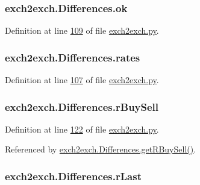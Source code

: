 \subsubsection[{\texorpdfstring{ok}{ok}}]{\setlength{\rightskip}{0pt plus 5cm}exch2exch.\+Differences.\+ok}\hypertarget{classexch2exch_1_1_differences_a6de3ee563584c83a97ba815db8ec7831}{}\label{classexch2exch_1_1_differences_a6de3ee563584c83a97ba815db8ec7831}


Definition at line \hyperlink{exch2exch_8py_source_l00109}{109} of file \hyperlink{exch2exch_8py_source}{exch2exch.\+py}.

\subsubsection[{\texorpdfstring{rates}{rates}}]{\setlength{\rightskip}{0pt plus 5cm}exch2exch.\+Differences.\+rates}\hypertarget{classexch2exch_1_1_differences_a64aec2fc7f20028f0bd834908cbea116}{}\label{classexch2exch_1_1_differences_a64aec2fc7f20028f0bd834908cbea116}


Definition at line \hyperlink{exch2exch_8py_source_l00107}{107} of file \hyperlink{exch2exch_8py_source}{exch2exch.\+py}.

\subsubsection[{\texorpdfstring{r\+Buy\+Sell}{rBuySell}}]{\setlength{\rightskip}{0pt plus 5cm}exch2exch.\+Differences.\+r\+Buy\+Sell}\hypertarget{classexch2exch_1_1_differences_a3cbdf344e8e0b804c611e6b9e3a3d1bd}{}\label{classexch2exch_1_1_differences_a3cbdf344e8e0b804c611e6b9e3a3d1bd}


Definition at line \hyperlink{exch2exch_8py_source_l00122}{122} of file \hyperlink{exch2exch_8py_source}{exch2exch.\+py}.



Referenced by \hyperlink{exch2exch_8py_source_l00142}{exch2exch.\+Differences.\+get\+R\+Buy\+Sell()}.

\subsubsection[{\texorpdfstring{r\+Last}{rLast}}]{\setlength{\rightskip}{0pt plus 5cm}exch2exch.\+Differences.\+r\+Last}\hypertarget{classexch2exch_1_1_differences_a3c26c51929ce75e055f8a606aaeb849d}{}\label{classexch2exch_1_1_differences_a3c26c51929ce75e055f8a606aaeb849d}


